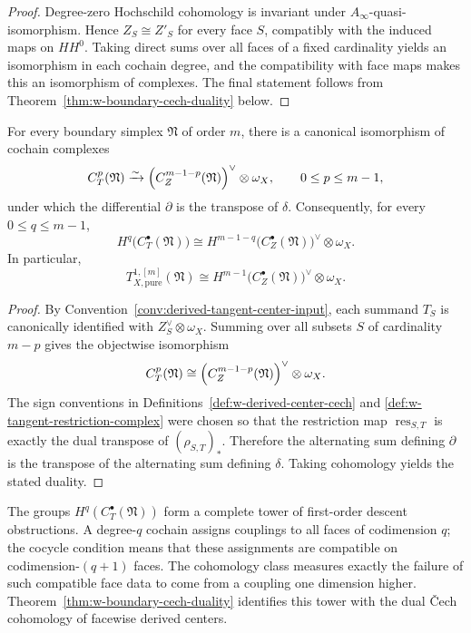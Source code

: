 \begin{proof}
Degree-zero Hochschild cohomology is invariant under $A_\infty$-quasi-isomorphism. Hence
$Z_S\cong Z'_S$ for every face $S$, compatibly with the induced maps on $HH^0$. Taking direct sums over all faces of a fixed cardinality yields an isomorphism in each cochain degree, and the compatibility with face maps makes this an isomorphism of complexes. The final statement follows from Theorem~\ref{thm:w-boundary-cech-duality} below.
\end{proof}

\begin{theorem}
For every boundary simplex $\mathfrak N$ of order $m$, there is a canonical isomorphism of cochain complexes
\[
C_T^p(\mathfrak N)
\xrightarrow{\sim}
\Bigl(C_Z^{m-1-p}(\mathfrak N)\Bigr)^\vee\otimes \omega_X,
\qquad 0\le p\le m-1,
\]
under which the differential $\partial$ is the transpose of $\delta$.
Consequently, for every $0\le q\le m-1$,
\[
H^q\bigl(C_T^\bullet(\mathfrak N)\bigr)
\cong
H^{m-1-q}\bigl(C_Z^\bullet(\mathfrak N)\bigr)^\vee\otimes \omega_X.
\]
In particular,
\[
T^{1,[m]}_{X,\mathrm{pure}}(\mathfrak N)
\cong
H^{m-1}\bigl(C_Z^\bullet(\mathfrak N)\bigr)^\vee\otimes \omega_X.
\]
\end{theorem}

\begin{proof}
By Convention~\ref{conv:derived-tangent-center-input}, each summand $T_S$ is canonically
identified with $Z_S^\vee\otimes \omega_X$. Summing over all subsets $S$ of cardinality $m-p$
gives the objectwise isomorphism
\[
C_T^p(\mathfrak N)
\cong
\Bigl(C_Z^{m-1-p}(\mathfrak N)\Bigr)^\vee\otimes \omega_X.
\]
The sign conventions in Definitions~\ref{def:w-derived-center-cech} and
\ref{def:w-tangent-restriction-complex} were chosen so that the restriction map
$\operatorname{res}_{S,T}$ is exactly the dual transpose of $(\rho_{S,T})_*$. Therefore the alternating
sum defining $\partial$ is the transpose of the alternating sum defining $\delta$.
Taking cohomology yields the stated duality.
\end{proof}

\begin{remark}[Interpretation]
The groups $H^q(C_T^\bullet(\mathfrak N))$ form a complete tower of first-order descent obstructions.
A degree-$q$ cochain assigns couplings to all faces of codimension $q$; the cocycle condition means
that these assignments are compatible on codimension-$(q+1)$ faces. The cohomology class measures
exactly the failure of such compatible face data to come from a coupling one dimension higher.
Theorem~\ref{thm:w-boundary-cech-duality} identifies this tower with the dual \v{C}ech cohomology of
facewise derived centers.
\end{remark}

